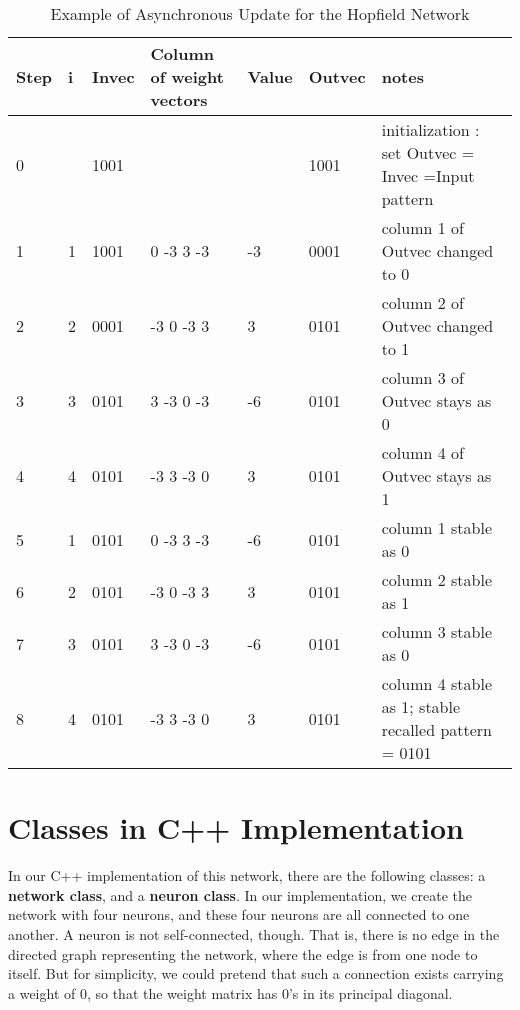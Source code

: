 \documentclass[12pt, right open]{memoir}
\begin{document}
\begin{center}
\begin{table}
\caption{Example of Asynchronous Update for the Hopfield Network}
\label{tab:example_of_asynchronous_update_for_the_hopfield_network}
\begin{tabular}{|l|l|l|p{3cm}|l|l|p{3cm}|}
\hline
Step & i & Invec & Column of weight vectors & Value & Outvec & notes \\
\hline
0    &   & 1001  &                          &       & 1001   & initialization : set Outvec = Invec =Input pattern\\
\hline
1    & 1 & 1001  & 0 -3 3 -3                & -3    & 0001   & column 1 of Outvec
changed to 0\\
\hline
2    & 2 & 0001  & -3 0 -3 3                &  3    & 0101   & column 2 of Outvec
changed to 1\\
\hline
3    & 3 & 0101  & 3 -3 0 -3                & -6    & 0101   & column 3 of Outvec
stays as 0\\
\hline
4    & 4 & 0101  & -3 3 -3 0                &  3    & 0101   & column 4 of Outvec
stays as 1\\
\hline
5    & 1 & 0101  & 0 -3 3 -3                & -6    & 0101   & column 1 stable as 0\\
\hline
6    & 2 & 0101  & -3 0 -3 3                &  3    & 0101   & column 2 stable as 1\\
\hline
7    & 3 & 0101  & 3 -3 0 -3                & -6    & 0101   & column 3 stable as 0\\
\hline
8    & 4 & 0101  & -3 3 -3 0                &  3    & 0101   & column 4 stable as
1; stable recalled pattern = 0101\\
\hline
\end{tabular}
\end{table}
\end{center}

\section{Classes in C++ Implementation}
In our C++ implementation of this network, there are the following classes: a
\textbf{network class}, and a \textbf{neuron class}. In our implementation, we create the
network with four neurons, and these four neurons are all connected to one
another. A neuron is not self-connected, though. That is, there is no edge in the
directed graph representing the network, where the edge is from one node to
itself. But for simplicity, we could pretend that such a connection exists
carrying a weight of 0, so that the weight matrix has 0’s in its principal
diagonal.
\end{document}
